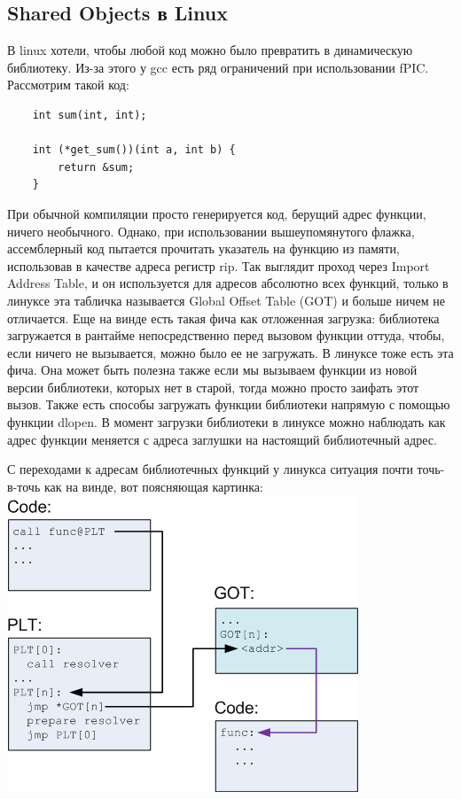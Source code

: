 \documentclass[12pt, a4paper]{article}
\begin{document}
\subsection{Shared Objects в Linux}
В linux хотели, чтобы любой код можно было превратить в динамическую библиотеку. Из-за этого у gcc есть ряд ограничений при использовании fPIC. Рассмотрим такой код:
\begin{verbatim}
	int sum(int, int);
	
	int (*get_sum())(int a, int b) {
		return &sum;
	}
\end{verbatim}
При обычной компиляции просто генерируется код, берущий адрес функции, ничего необычного. Однако, при использовании вышеупомянутого флажка, ассемблерный код пытается прочитать указатель на функцию из памяти, использовав в качестве адреса регистр rip. Так выглядит проход через Import Address Table, и он используется для адресов абсолютно всех функций, только в линуксе эта табличка называется Global Offset Table (GOT) и больше ничем не отличается. Еще на винде есть такая фича как отложенная загрузка: библиотека загружается в рантайме непосредственно перед вызовом функции оттуда, чтобы, если ничего не вызывается, можно было ее не загружать. В линуксе тоже есть эта фича. Она может быть полезна также если мы вызываем функции из новой версии библиотеки, которых нет в старой, тогда можно просто заифать этот вызов. Также есть способы загружать функции библиотеки напрямую с помощью функции dlopen. В момент загрузки библиотеки в линуксе можно наблюдать как адрес функции меняется с адреса заглушки на настоящий библиотечный адрес. \\
\par С переходами к адресам библиотечных функций у линукса ситуация почти точь-в-точь как на винде, вот поясняющая картинка:\\
\includegraphics[scale=0.65]{plt.png}\\\\
\end{document}
